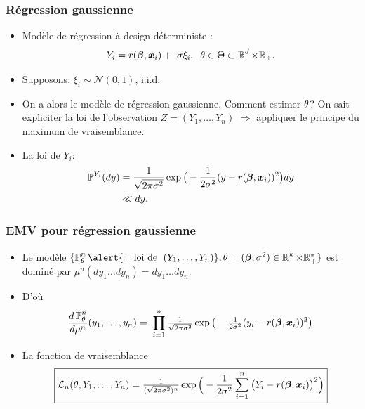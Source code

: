 \begin{frame}
\frametitle{Régression gaussienne}


\begin{itemize}
\item  Modèle de régression à design déterministe :
$$Y_i =
r({\boldsymbol{\beta}},\operatorname{\boldsymbol{x}}_i)+\ \sigma \xi_i,\;\;\theta \in \Theta\subset  \operatorname{{\mathbb R}}^d \times \mathbb{R}_+.$$
\item  Supposons: $\xi_i \sim {\mathcal N}(0,1)$, i.i.d.
\item On a alors le modèle de \alert{régression gaussienne}.
Comment estimer $\theta$?  \alert{On sait expliciter la loi
de l'observation} $Z=(Y_1,\dots,Y_n)$ $\Longrightarrow$ appliquer le
principe du maximum de vraisemblance.

\item La loi de $Y_i$:
\begin{align*}
\operatorname{{\mathbb P}}^{Y_i}(dy) & = \frac{1}{\sqrt{2\pi \sigma^2}}\exp\big
(-\frac{1}{2\sigma^2}(y-r({\boldsymbol{\beta}},\operatorname{\boldsymbol{x}}_i))^2\big)dy \\
& \ll dy.
\end{align*}

\end{itemize}
\end{frame}

\begin{frame}
\frametitle{EMV pour régression gaussienne}
\begin{itemize}
\item  Le modèle $\{\PP_\truetheta^n \alert{ = \text{loi de }\;(Y_1,\ldots, Y_n)},\truetheta = (\truebeta,\sigma^2) \in \R^k \times \rset_+^* \}$ est \alert{dominé} par
$\mu^n(dy_1\ldots dy_n) = dy_1\ldots dy_n.$
\item D'où
\[
 \frac{d\operatorname{{\mathbb P}}_\theta^n}{d\mu^n}(y_1,\ldots, y_n)
  =\; \prod_{i=1}^n \tfrac{1}{\sqrt{2\pi \sigma^2}}\exp
  \big(-\tfrac{1}{2\sigma^2}(y_i-r({\boldsymbol{\beta}},\operatorname{\boldsymbol{x}}_i))^2\big) 
\]
\item La fonction de vraisemblance
$$\boxed{{\mathcal L}_n(\theta, Y_1,\ldots, Y_n)
= \tfrac{1}{(\sqrt{2\pi \sigma^2})^{n}} \exp\Big(-\frac{1}{2\sigma^2}\sum_{i = 1}^n\big(Y_i-
r({\boldsymbol{\beta}},\operatorname{\boldsymbol{x}}_i)\big)^2\Big)}$$
\end{itemize}
\end{frame}


